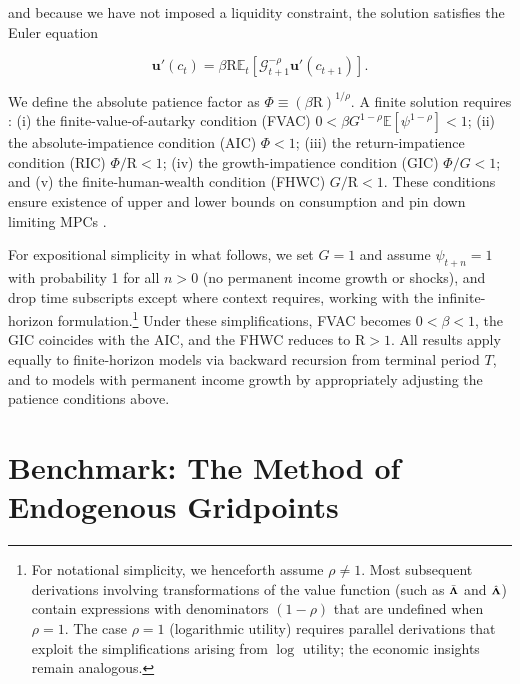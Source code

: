 \documentclass[preprint,authoryear]{elsarticle}
\newcommand{\Ex}{\mathbf{\mathbb{E}}}
\newcommand{\DiscFac}{\beta}
\newcommand{\uFunc}{\mathbf{u}}
\newcommand{\CRRA}{\rho}
\newcommand{\cNrm}{c}
\newcommand{\Rfree}{\text{R}}
\newcommand{\PermGroShk}{\mathcal{G}}
\newcommand{\PermGroFac}{G}
\newcommand{\permShk}{\psi}
\newcommand{\uPrime}{\uFunc'}
\newcommand{\AbsPatFac}{\Phi}
\newcommand{\vInv}{{\scriptsize \boldsymbol{\Lambda}}}
\newcommand{\vInvOpt}{\bar{\vInv}}
\newcommand{\vInvReal}{\hat{\vInv}}
\begin{document}
and because we have not imposed a liquidity constraint, the solution satisfies
the Euler equation

\begin{equation}
\label{eq:cEuler}
\uPrime(\cNrm_{t}) = \DiscFac \Rfree \Ex_{t}[ \PermGroShk_{t+1}^{-\CRRA} \uPrime(\cNrm_{t+1})].
\end{equation}

We define the absolute patience factor as $\AbsPatFac\equiv(\DiscFac\Rfree)^{1/\CRRA}$. A finite solution requires \citep{CarrollShanker2024}: (i) the finite-value-of-autarky condition (FVAC) $0<\DiscFac\PermGroFac^{1 -\CRRA}\Ex[\permShk^{1 -\CRRA}]<1$; (ii) the absolute-impatience condition (AIC) $\AbsPatFac<1$; (iii) the return-impatience condition (RIC) $\AbsPatFac/\Rfree<1$; (iv) the growth-impatience condition (GIC) $\AbsPatFac/\PermGroFac<1$; and (v) the finite-human-wealth condition (FHWC) $\PermGroFac/\Rfree<1$. These conditions ensure existence of upper and lower bounds on consumption \citep{Carroll2001MPCBound, StachurskiToda2019JET} and pin down limiting MPCs \citep{MaToda2021SavingRateRich}.

For expositional simplicity in what follows, we set $\PermGroFac=1$ and assume $\permShk_{t+n}=1$ with probability 1 for all $n>0$ (no permanent income growth or shocks), and drop time subscripts except where context requires, working with the infinite-horizon formulation.\footnote{For notational simplicity, we henceforth assume $\CRRA \neq 1$. Most subsequent derivations involving transformations of the value function (such as $\vInvOpt$ and $\vInvReal$) contain expressions with denominators $(1 -\CRRA)$ that are undefined when $\CRRA=1$. The case $\CRRA=1$ (logarithmic utility) requires parallel derivations that exploit the simplifications arising from $\log$ utility; the economic insights remain analogous.} Under these simplifications, FVAC becomes $0<\DiscFac<1$, the GIC coincides with the AIC, and the FHWC reduces to $\Rfree>1$. All results apply equally to finite-horizon models via backward recursion from terminal period $T$, and to models with permanent income growth by appropriately adjusting the patience conditions above.

\section{Benchmark: The Method of Endogenous Gridpoints}\label{benchmark-the-method-of-endogenous-gridpoints}
\end{document}
